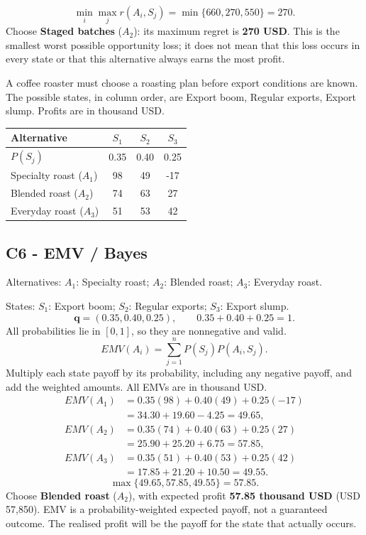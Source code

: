 \[\min_i\max_j r(A_i,S_j)=\min\{660,270,550\}=270.\]
Choose \textbf{Staged batches} ($A_2$): its maximum regret is \textbf{270 USD}. This is the smallest worst possible opportunity loss; it does not mean that this loss occurs in every state or that this alternative always earns the most profit.
\par\vspace{4mm}

\clearpage
{}
A coffee roaster must choose a roasting plan before export conditions are known. The possible states, in column order, are Export boom, Regular exports, Export slump. Profits are in thousand USD.
\begin{center}
\begin{tabular}{@{}lccc@{}}\toprule
Alternative & $S_1$ & $S_2$ & $S_3$\\\midrule
$P(S_j)$ & 0.35 & 0.40 & 0.25\\
Specialty roast ($A_1$) & 98 & 49 & -17\\
Blended roast ($A_2$) & 74 & 63 & 27\\
Everyday roast ($A_3$) & 51 & 53 & 42\\
\bottomrule\end{tabular}
\end{center}
\subsection*{C6 - EMV / Bayes }
\label{sol:coffee-roasting-c6}
Alternatives: $A_1$: Specialty roast; $A_2$: Blended roast; $A_3$: Everyday roast.\par
States: $S_1$: Export boom; $S_2$: Regular exports; $S_3$: Export slump.
\[\boldsymbol{q}=(0.35,0.40,0.25),\qquad 0.35+0.40+0.25=1.\]
All probabilities lie in $[0,1]$, so they are nonnegative and valid.
\[EMV(A_i)=\sum_{j=1}^{n}P(S_j)P(A_i,S_j).\]
Multiply each state payoff by its probability, including any negative payoff, and add the weighted amounts. All EMVs are in thousand USD.
\begin{align*}
EMV(A_1)&=0.35(98)+0.40(49)+0.25(-17)\\&=34.30+19.60-4.25=49.65,\\
EMV(A_2)&=0.35(74)+0.40(63)+0.25(27)\\&=25.90+25.20+6.75=57.85,\\
EMV(A_3)&=0.35(51)+0.40(53)+0.25(42)\\&=17.85+21.20+10.50=49.55.
\end{align*}
\[\max\{49.65,57.85,49.55\}=57.85.\]
Choose \textbf{Blended roast} ($A_2$), with expected profit \textbf{57.85 thousand USD} (USD 57,850). EMV is a probability-weighted expected payoff, not a guaranteed outcome. The realised profit will be the payoff for the state that actually occurs.
\par\vspace{4mm}

